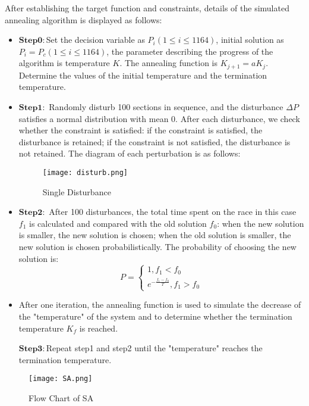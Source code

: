 \documentclass{mcmthesis}
\begin{document}
After establishing the target function and constraints, details of the simulated annealing algorithm is displayed as follows:

\begin{itemize}
	\setlength{\itemsep}{0pt}
	\setlength{\parsep}{0pt}
	\setlength{\parskip}{0pt}
	\item  $\boldsymbol{Step0:}$Set the decision variable as $P_i(1\leq i\leq 1164)$, initial solution as $P_i=P_c(1\leq i\leq 1164)$, the parameter describing the progress of the algorithm is temperature $K$. The annealing function is $K_{j+1}=aK_{j}$. Determine the values of the initial temperature and the termination temperature.
	\item  $\boldsymbol{Step1:}$ Randomly disturb 100 sections in sequence, and the disturbance $\Delta P$ satisfies a normal distribution with mean 0. After each disturbance, we check whether the constraint is satisfied: if the constraint is satisfied, the disturbance is retained; if the constraint is not satisfied, the disturbance is not retained. The diagram of each perturbation is as follows:
	\begin{figure}[h]
		\small
		\centering
		\texttt{[image: disturb.png]}
		\caption{Single Disturbance} 
	\end{figure}
	
	\item  $\boldsymbol{Step2:}$ After 100 disturbances, the total time spent on the race in this case $f_1$ is calculated and compared with the old solution $f_0$: when the new solution is smaller, the new solution is chosen; when the old solution is smaller, the new solution is chosen probabilistically. The probability of choosing the new solution is:
	\begin{equation}
		P=\begin{cases} 	
			1, f_1<f_0\\
			e^{-\frac{f_1-f_0}{T}}, f_1>f_0
		\end{cases}
	\end{equation}
	
	\item
	After one iteration, the annealing function is used to simulate the decrease of the "temperature" of the system and to determine whether the termination temperature $K_f$ is reached.
	
	$\boldsymbol{Step3:}$Repeat step1 and step2 until the "temperature" reaches the termination temperature.
\end{itemize}
\begin{figure}[h]
	\small
	\centering
	\texttt{[image: SA.png]}
	\caption{Flow Chart of SA} 
\end{figure}
\end{document}
